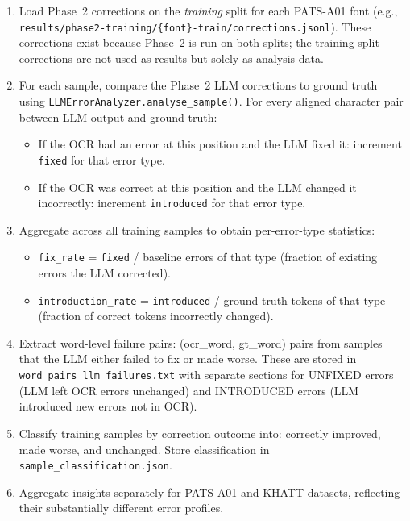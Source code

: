 \begin{enumerate}
  \item Load Phase~2 corrections on the \emph{training} split for each
        PATS-A01 font (e.g.,
        \texttt{results/phase2-training/\{font\}-train/corrections.jsonl}).
        These corrections exist because Phase~2 is run on both splits;
        the training-split corrections are not used as results but solely
        as analysis data.

  \item For each sample, compare the Phase~2 LLM corrections to ground truth
        using \texttt{LLMErrorAnalyzer.analyse\_sample()}.
        For every aligned character pair between LLM output and ground truth:
        \begin{itemize}
          \item If the OCR had an error at this position and the LLM fixed it:
                increment \texttt{fixed} for that error type.
          \item If the OCR was correct at this position and the LLM changed it
                incorrectly: increment \texttt{introduced} for that error type.
        \end{itemize}

  \item Aggregate across all training samples to obtain per-error-type
        statistics:
        \begin{itemize}
          \item \texttt{fix\_rate} = \texttt{fixed} / baseline errors of that
                type (fraction of existing errors the LLM corrected).
          \item \texttt{introduction\_rate} = \texttt{introduced} /
                ground-truth tokens of that type (fraction of correct tokens
                incorrectly changed).
        \end{itemize}

  \item Extract word-level failure pairs: (ocr\_word, gt\_word) pairs from
        samples that the LLM either failed to fix or made worse. These
        are stored in \texttt{word\_pairs\_llm\_failures.txt} with separate
        sections for UNFIXED errors (LLM left OCR errors unchanged) and
        INTRODUCED errors (LLM introduced new errors not in OCR).

  \item Classify training samples by correction outcome into:
        correctly improved, made worse, and unchanged. Store classification
        in \texttt{sample\_classification.json}.

  \item Aggregate insights separately for PATS-A01 and KHATT datasets,
        reflecting their substantially different error profiles.
\end{enumerate}

